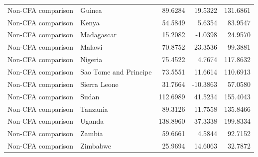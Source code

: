 \begin{table}
\begin{tabular}[t]{llrrr}
Non-CFA comparison & Guinea & 89.6284 & 19.5322 & 131.6861\\
Non-CFA comparison & Kenya & 54.5849 & 5.6354 & 83.9547\\
\addlinespace
Non-CFA comparison & Madagascar & 15.2082 & -1.0398 & 24.9570\\
Non-CFA comparison & Malawi & 70.8752 & 23.3536 & 99.3881\\
Non-CFA comparison & Nigeria & 75.4522 & 4.7674 & 117.8632\\
Non-CFA comparison & Sao Tome and Principe & 73.5551 & 11.6614 & 110.6913\\
Non-CFA comparison & Sierra Leone & 31.7664 & -10.3863 & 57.0580\\
\addlinespace
Non-CFA comparison & Sudan & 112.6989 & 41.5234 & 155.4043\\
Non-CFA comparison & Tanzania & 89.3126 & 11.7558 & 135.8466\\
Non-CFA comparison & Uganda & 138.8960 & 37.3338 & 199.8334\\
Non-CFA comparison & Zambia & 59.6661 & 4.5844 & 92.7152\\
Non-CFA comparison & Zimbabwe & 25.9694 & 14.6063 & 32.7872\\
\bottomrule
\end{tabular}
\end{table}